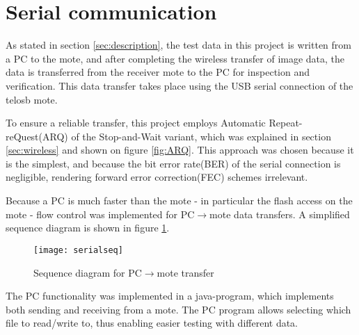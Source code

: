 \section{Serial communication}

As stated in section \ref{sec:description}, the test data in this project is written from a PC to the mote, and after completing the wireless transfer of image data, the data is transferred from the receiver mote to the PC for inspection and verification. This data transfer takes place using the USB serial connection of the telosb mote.

To ensure a reliable transfer, this project employs Automatic Repeat-reQuest(ARQ) of the Stop-and-Wait variant, which was explained in section \ref{sec:wireless} and shown on figure \ref{fig:ARQ}. This approach was chosen because it is the simplest, and because the bit error rate(BER) of the serial connection is negligible, rendering forward error correction(FEC) schemes irrelevant.

Because a PC is much faster than the mote - in particular the flash access on the mote - flow control was implemented for PC$\rightarrow$mote data transfers. A simplified sequence diagram is shown in figure \ref{fig:serialseq}.

\begin{figure}
\centering
\texttt{[image: serialseq]}
\caption{Sequence diagram for PC$\rightarrow$mote transfer}
\label{fig:serialseq}
\end{figure}

The PC functionality was implemented in a java-program, which implements both sending and receiving from a mote. The PC program allows selecting which file to read/write to, thus enabling easier testing with different data.

